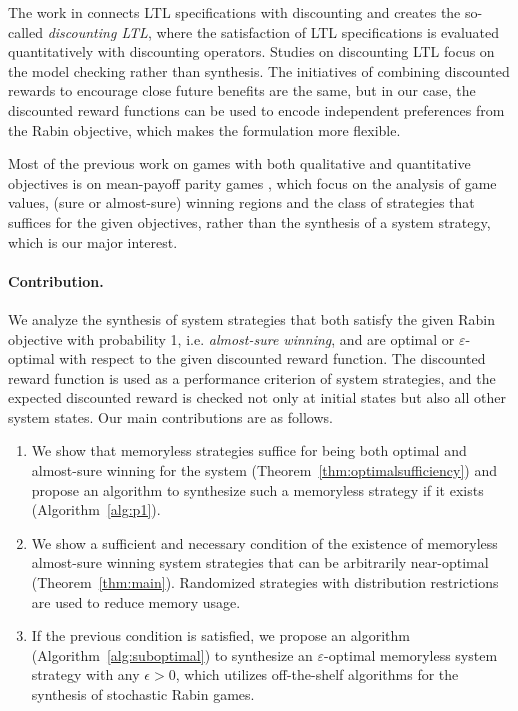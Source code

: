 \documentclass[runningheads,a4paper]{llncs}
\begin{document}
The work in \cite{de2003discounting, almagor2014discounting} connects LTL specifications with discounting and creates the so-called \emph{discounting LTL}, where the satisfaction of LTL specifications is evaluated quantitatively with discounting operators. Studies on discounting LTL focus on the model checking rather than synthesis. The initiatives of combining discounted rewards to encourage close future benefits are the same, but in our case, the discounted reward functions can be used to encode independent preferences from the Rabin objective, which makes the formulation more flexible. 

Most of the previous work on games with both qualitative and quantitative objectives is on mean-payoff parity games \cite{chatterjee2005mean, bloem2009better, chatterjee2014perfect}, which focus on the analysis of game values, (sure or almost-sure) winning regions and the class of strategies that suffices for the given objectives, rather than the synthesis of a system strategy, which is our major interest. 










\paragraph{Contribution.}
We analyze the synthesis of system strategies that both satisfy the given Rabin objective with probability 1, i.e. \emph{almost-sure winning}, and are optimal or $\varepsilon$-optimal with respect to the given discounted reward function. The discounted reward function is used as a performance criterion of system strategies, and the expected discounted reward is checked not only at initial states but also all other system states. Our main contributions are as follows. 

\begin{enumerate}
\item We show that memoryless strategies suffice for being both optimal and almost-sure winning for the system (Theorem~\ref{thm:optimalsufficiency}) and propose an algorithm to synthesize such a memoryless strategy if it exists (Algorithm~\ref{alg:p1}).\item We show a sufficient and necessary condition of the existence of memoryless almost-sure winning system strategies that can be arbitrarily near-optimal (Theorem~\ref{thm:main}). Randomized strategies with distribution restrictions are used to reduce memory usage. 
\item If the previous condition is satisfied, we propose an algorithm (Algorithm~\ref{alg:suboptimal}) to synthesize an $\varepsilon$-optimal memoryless system strategy with any $\epsilon > 0$, which utilizes off-the-shelf algorithms for the synthesis of stochastic Rabin games. 
\end{enumerate}
 
\end{document}
